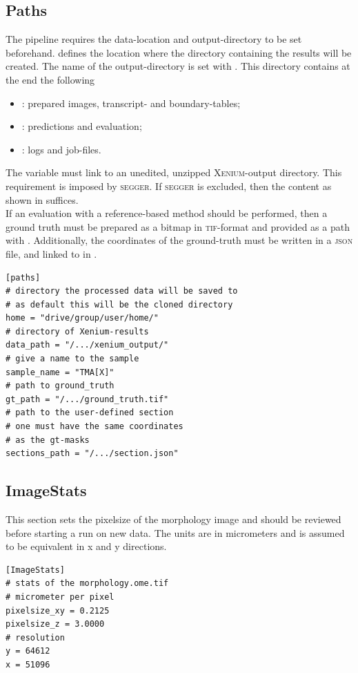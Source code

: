 \subsection*{Paths}
The pipeline requires the data-location and output-directory to be set beforehand.  defines the location where the directory containing the results will be created. The name of the output-directory is set with . This directory contains at the end the following
\begin{itemize}
    \item[] : prepared images, transcript- and boundary-tables;
    \item[] : predictions and evaluation;
    \item[] : logs and job-files.
\end{itemize}
The  variable must link to an unedited, unzipped \textsc{Xenium}-output directory. This requirement is imposed by \textsc{segger}. If \textsc{segger} is excluded, then the content as shown in  suffices.\\
If an evaluation with a reference-based method should be performed, then a ground truth must be prepared as a bitmap in \textsc{tif}-format and provided as a path with . Additionally, the coordinates of the ground-truth must be written in a \textsc{json} file, and linked to in .\\
\begin{lstlisting}[style=customIni]
[paths]
# directory the processed data will be saved to
# as default this will be the cloned directory
home = "drive/group/user/home/"
# directory of Xenium-results
data_path = "/.../xenium_output/"
# give a name to the sample
sample_name = "TMA[X]"
# path to ground_truth
gt_path = "/.../ground_truth.tif"
# path to the user-defined section
# one must have the same coordinates
# as the gt-masks
sections_path = "/.../section.json"
\end{lstlisting}
\subsection*{ImageStats}
This section sets the pixelsize of the morphology image and should be reviewed before starting a run on new data. The units are in micrometers and is assumed to be equivalent in x and y directions.
\begin{lstlisting}[style=customIni]
[ImageStats]
# stats of the morphology.ome.tif
# micrometer per pixel
pixelsize_xy = 0.2125
pixelsize_z = 3.0000
# resolution
y = 64612
x = 51096
\end{lstlisting}
